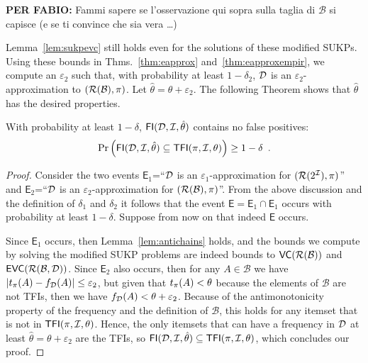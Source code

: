 {\bf PER FABIO:} Fammi sapere se l'osservazione qui sopra sulla taglia di
$\mathcal{B}$ si capisce (e se ti convince che sia vera \ldots)

Lemma~\ref{lem:sukpevc} still holds even for the solutions of these modified
SUKPs. Using these bounds in Thms.~\ref{thm:eapprox} and~\ref{thm:eapproxempir},
we compute an $\varepsilon_2$ such that, with probability at least $1-\delta_2$,
${\cal D}$ is an $\varepsilon_2$-approximation to $(\mathcal{R}(\mathcal{B}),\pi)$. Let
$\hat{\theta}=\theta+\varepsilon_2$. The following Theorem shows that
$\hat{\theta}$ has the desired properties.

\begin{theorem}\label{lem:vcfull}
With probability at least $1-\delta$, $\mathsf{FI}({\cal D},{\cal I},\hat\theta)$ contains no false positives:
\[
\Pr\left(\mathsf{FI}({\cal D},{\cal I},\hat\theta)\subseteq\mathsf{TFI}(\pi,{\cal I},\theta)\right)\ge 1-\delta\enspace.\]
\end{theorem}
\begin{proof}
  Consider the two events $\mathsf{E}_1$=``${\cal D}$ is an
  $\varepsilon_1$-approximation for $(\mathcal{R}(2^{\cal I}),\pi)$'' and
  $\mathsf{E}_2$=``${\cal D}$ is an $\varepsilon_2$-approximation for
  $(\mathcal{R}(\mathcal{B}),\pi)$''. From the above discussion and the definition
  of $\delta_1$ and $\delta_2$ it follows that the event
  $\mathsf{E}=\mathsf{E}_1\cap\mathsf{E}_1$ occurs with probability at least
  $1-\delta$. Suppose from now on that indeed $\mathsf{E}$ occurs.

  Since $\mathsf{E}_1$ occurs, then Lemma~\ref{lem:antichains} holds, and the
  bounds we compute by solving the modified SUKP problems are indeed bounds to
  $\mathsf{VC}(\mathcal{R}(\mathcal{B}))$ and $\mathsf{EVC}(\mathcal{R}(\mathcal{B},{\cal D}))$. %
  Since $\mathsf{E}_2$ also occurs, then for any $A\in\mathcal{B}$ we have
  $|t_\pi(A)-f_{\cal D}(A)|\le\varepsilon_2$, but given that $t_\pi(A)<\theta$
  because the elements of $\mathcal{B}$ are not TFIs, then we have
  $f_{\cal D}(A)<\theta+\varepsilon_2$. Because of the antimonotonicity property of
  the frequency and the definition of $\mathcal{B}$, this holds for any itemset
  that is not in $\mathsf{TFI}(\pi,{\cal I},\theta)$. Hence, the only itemsets that can
  have a frequency in ${\cal D}$ at least $\hat{\theta}=\theta+\varepsilon_2$ are the
  TFIs, so $\mathsf{FI}({\cal D},{\cal I},\hat{\theta})\subseteq\mathsf{TFI}(\pi,{\cal I},\theta)$, which
  concludes our proof.
\end{proof}

